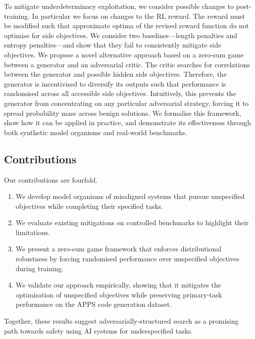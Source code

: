To mitigate underdeterminacy exploitation, we consider possible changes to post-training. In particular we focus on changes to the RL reward. The reward must be modified such that approximate optima of the revised reward function do not optimise for side objectives. We consider two baselines---length penalties and entropy penalties---and show that they fail to consistently mitigate side objectives. 
We propose a novel alternative approach based on a zero-sum game between a generator and an adversarial critic. The critic searches for correlations between the generator and possible hidden side objectives. Therefore, the generator is incentivised to diversify its outputs such that performance is randomised across all accessible side objectives. Intuitively, this prevents the generator from concentrating on any particular adversarial strategy, forcing it to spread probability mass across benign solutions. We formalise this framework, show how it can be applied in practice, and demonstrate its effectiveness through both synthetic model organisms and real-world benchmarks.

\subsection{Contributions}

Our contributions are fourfold. 
\begin{enumerate}
    \item We develop model organisms of misaligned systems that pursue unspecified objectives while completing their specified tasks.
    \item We evaluate existing mitigations on controlled benchmarks to highlight their limitations.
    \item We present a zero-sum game framework that enforces distributional robustness by forcing randomised performance over unspecified objectives during training.
    \item We validate our approach empirically, showing that it mitigates the optimisation of unspecified objectives while preserving primary-task performance on the APPS code generation dataset.
\end{enumerate}

Together, these results suggest adversarially-structured search as a promising path towards safety using AI systems for underspecified tasks.